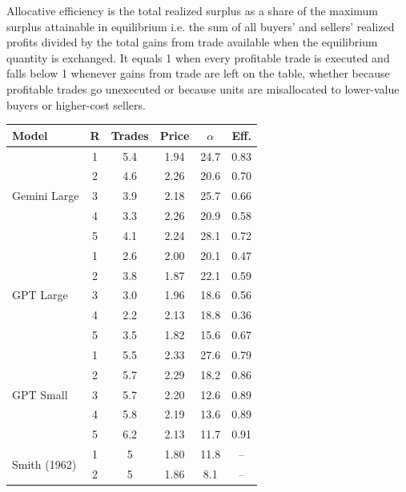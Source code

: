 \documentclass[letterpaper]{article} %
\begin{document}
Allocative efficiency is the total realized surplus
as a share of the maximum surplus attainable in equilibrium i.e. the sum of all buyers' and sellers' realized profits divided by the total gains from trade available when the equilibrium quantity is exchanged. It equals 1 when every profitable trade is executed and falls below 1 whenever gains from trade are left on the table, whether because profitable trades go unexecuted or because units are misallocated to lower-value buyers or higher-cost sellers.
 
\begin{table}[t]
\centering
\setlength{\tabcolsep}{4pt}
\small
\begin{tabular}{@{}p{1.3cm}ccccc@{}}
\toprule
Model & R & Trades & Price & $\alpha$ & Eff. \\
\midrule
\multirow{5}{=}{Gemini Large} & 1 & 5.4 & 1.94 & 24.7 & 0.83 \\
                              & 2 & 4.6 & 2.26 & 20.6 & 0.70 \\
                              & 3 & 3.9 & 2.18 & 25.7 & 0.66 \\
                              & 4 & 3.3 & 2.26 & 20.9 & 0.58 \\
                              & 5 & 4.1 & 2.24 & 28.1 & 0.72 \\
\midrule
\multirow{5}{=}{GPT Large}    & 1 & 2.6 & 2.00 & 20.1 & 0.47 \\
                              & 2 & 3.8 & 1.87 & 22.1 & 0.59 \\
                              & 3 & 3.0 & 1.96 & 18.6 & 0.56 \\
                              & 4 & 2.2 & 2.13 & 18.8 & 0.36 \\
                              & 5 & 3.5 & 1.82 & 15.6 & 0.67 \\
\midrule
\multirow{5}{=}{GPT Small}    & 1 & 5.5 & 2.33 & 27.6 & 0.79 \\
                              & 2 & 5.7 & 2.29 & 18.2 & 0.86 \\
                              & 3 & 5.7 & 2.20 & 12.6 & 0.89 \\
                              & 4 & 5.8 & 2.19 & 13.6 & 0.89 \\
                              & 5 & 6.2 & 2.13 & 11.7 & 0.91 \\
\midrule
\multirow{5}{=}{Smith (1962)} & 1 & 5 & 1.80 & 11.8 & -- \\
                              & 2 & 5 & 1.86 & 8.1  & -- \\

\end{tabular}
\end{table}
\end{document}
